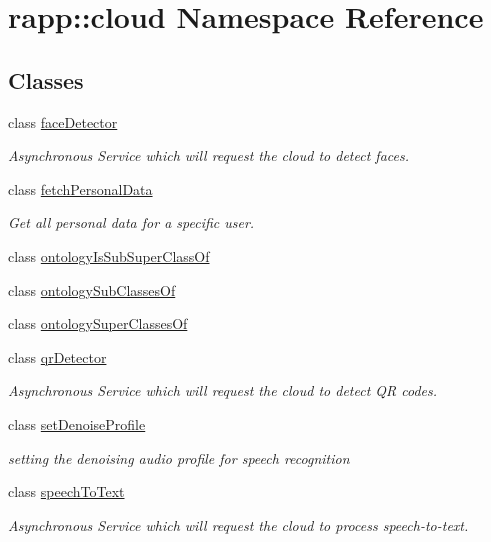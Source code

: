 \hypertarget{namespacerapp_1_1cloud}{\section{rapp\-:\-:cloud Namespace Reference}
\label{namespacerapp_1_1cloud}
}
\subsection*{Classes}
\begin{DoxyCompactItemize}
\item 
class \hyperlink{classrapp_1_1cloud_1_1faceDetector}{face\-Detector}
\begin{DoxyCompactList}\small\item\em Asynchronous Service which will request the cloud to detect faces. \end{DoxyCompactList}\item 
class \hyperlink{classrapp_1_1cloud_1_1fetchPersonalData}{fetch\-Personal\-Data}
\begin{DoxyCompactList}\small\item\em Get all personal data for a specific user. \end{DoxyCompactList}\item 
class \hyperlink{classrapp_1_1cloud_1_1ontologyIsSubSuperClassOf}{ontology\-Is\-Sub\-Super\-Class\-Of}
\item 
class \hyperlink{classrapp_1_1cloud_1_1ontologySubClassesOf}{ontology\-Sub\-Classes\-Of}
\item 
class \hyperlink{classrapp_1_1cloud_1_1ontologySuperClassesOf}{ontology\-Super\-Classes\-Of}
\item 
class \hyperlink{classrapp_1_1cloud_1_1qrDetector}{qr\-Detector}
\begin{DoxyCompactList}\small\item\em Asynchronous Service which will request the cloud to detect Q\-R codes. \end{DoxyCompactList}\item 
class \hyperlink{classrapp_1_1cloud_1_1setDenoiseProfile}{set\-Denoise\-Profile}
\begin{DoxyCompactList}\small\item\em setting the denoising audio profile for speech recognition \end{DoxyCompactList}\item 
class \hyperlink{classrapp_1_1cloud_1_1speechToText}{speech\-To\-Text}
\begin{DoxyCompactList}\small\item\em Asynchronous Service which will request the cloud to process speech-\/to-\/text. \end{DoxyCompactList}\end{DoxyCompactItemize}
